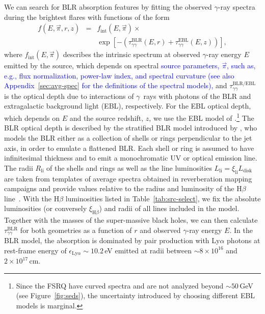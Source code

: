 \documentclass[twocolumn,linenumbers]{aastex62}
\newcommand{\Grays}{$\gamma$~rays\xspace}
\newcommand{\gray}{$\gamma$-ray\xspace}
\newcommand{\response}[1]{\textcolor{blue}{#1}}
\begin{document}
We can search for BLR absorption features by fitting the observed \gray spectra during the brightest flares with functions of the form 
\begin{eqnarray}
    f(E,\vec{\pi},r,z) &=& f_\mathrm{int}(E,\vec{\pi}) \times \nonumber \\ &{}& \exp\left[-\left(\tau_{\gamma\gamma}^\mathrm{BLR}(E,r) +\tau_{\gamma\gamma}^\mathrm{EBL}(E,z) \right)  \right],
\end{eqnarray} 
where $f_\mathrm{int}(E, \vec{\pi})$ describes the intrinsic spectrum at observed \gray energy $E$ emitted by the source, which depends on spectral 
\response{
source parameters, $\vec{\pi}$, such as, e.g.,  flux normalization, power-law index, and spectral curvature (see also Appendix~\ref{sec:avg-spec} for the definitions of the spectral models),
}
and $\tau_{\gamma\gamma}^\mathrm{BLR / EBL}$ is the optical depth due to interactions of \Grays with photons of the BLR and extragalactic background light (EBL), respectively. 
For the EBL optical depth, which depends on $E$ and the source redshift, $z$, we use the EBL model of \citet{2011MNRAS.410.2556D}.\footnote{
Since the FSRQ have curved spectra and are not analyzed beyond $\sim 50\,$GeV (see Figure~\ref{fig:seds}), the uncertainty introduced by choosing different EBL models is marginal.
}
The BLR optical depth is described by the stratified BLR model introduced by \citet{finke2016}, who models the BLR either as a collection of shells or rings perpendicular to the jet axis, in order to emulate a flattened BLR. 
Each shell or ring is assumed to have infinitesimal thickness and to emit a monochromatic UV or optical emission line. 
The radii $R_\mathrm{li}$ of the shells and rings as well as the line luminosities $L_\mathrm{li} = \xi_\mathrm{li}L_\mathrm{disk}$ are taken from templates of average spectra obtained in reverberation mapping campaigns and provide values relative to the radius and luminosity of the H$\beta$ line~\citep[see][for further details]{finke2016}.
With the H$\beta$ luminosities listed in Table~\ref{tab:src-select}, we fix the absolute luminosities (or conversely $\xi_{\mathrm{H}\beta}$) and radii of all lines included in the model.  
Together with the masses of the super-massive black holes, we can then calculate $\tau_{\gamma\gamma}^\mathrm{BLR}$ for both geometries as a function of $r$ and observed \gray energy $E$.
In the BLR model, the absorption is dominated by pair production with Ly$\alpha$ photons at rest-frame energy of $\epsilon_{\mathrm{Ly}\alpha}\sim10.2\,$eV emitted at radii between $\sim 8\times10^{16}$ and $2\times10^{17}$\,cm. 
\end{document}
